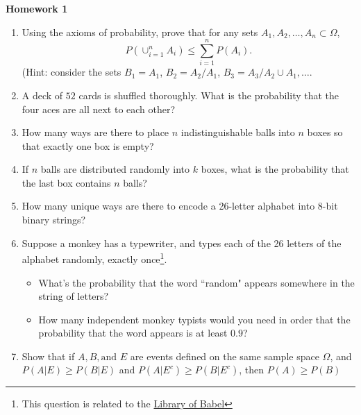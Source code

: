 \documentclass[10pt,twoside]{article}\usepackage[]{graphicx}\usepackage[dvipsnames,svgnames,table]{xcolor}
\begin{document}
\begin{flushright}
\begin{minipage}{.33\textwidth}
\rightline{\today}
\end{minipage}
\end{flushright}

\begin{center}
{\large{\textbf{Homework 1}}}
\end{center}

\begin{enumerate}
    \item Using the axioms of probability, prove that for any sets $A_1, A_2, \ldots, A_n \subset \Omega$,
    $$
    P\left(\cup_{i = 1}^n A_i\right) \leq \sum_{i = 1}^n P(A_i).
    $$
    (Hint: consider the sets $B_1 = A_1$, $B_2 = A_2 / A_1$, $B_3 = A_3 / A_2 \cup A_1, \ldots$.
    
    \item A deck of $52$ cards is shuffled thoroughly. What is the probability that the four aces are all next to each other? 

    \item How many ways are there to place $n$ indistinguishable balls into $n$ boxes so that exactly one box is empty? 
    
    \item If $n$ balls are distributed randomly into $k$ boxes, what is the probability that the last box contains $n$ balls?
    
    \item How many unique ways are there to encode a 26-letter alphabet into 8-bit binary strings?
    
    \item Suppose a monkey has a typewriter, and types each of the 26 letters of the alphabet randomly, exactly once\footnote{This question is related to the \href{https://libraryofbabel.info/About.html}{Library of Babel}}.
    \begin{itemize}
      \item What's the probability that the word ``random" appears somewhere in the string of letters? 
      \item How many independent monkey typists would you need in order that the probability that the word appears is at least $0.9$?
    \end{itemize}
    
    \item Show that if $A, B, \text{and } E$ are events defined on the same sample space $\Omega$, and $P(A|E) \geq P(B|E)$ and $P(A|E^c) \geq P(B|E^c)$, then $P(A) \geq P(B)$
    

\end{enumerate}
\end{document}
